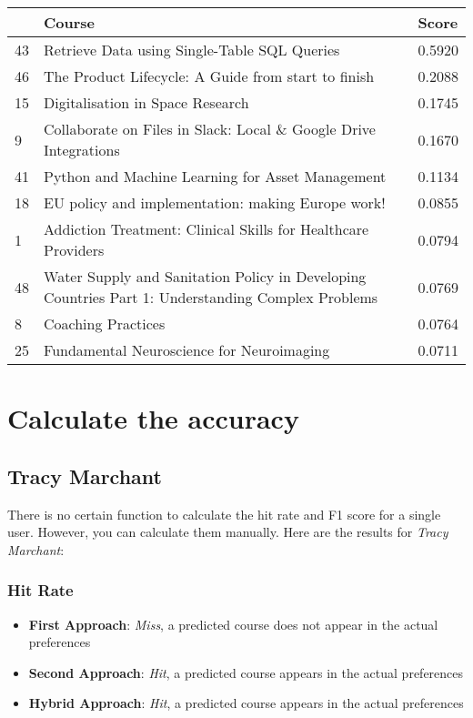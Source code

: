 \begin{table}[H]
\small
\begin{tabular}{|p{0.5cm}|p{10cm}|p{1.5cm}|}
\hline
& Course & Score \\
\hline
43 & Retrieve Data using Single-Table SQL Queries & 0.5920 \\
46 & The Product Lifecycle: A Guide from start to finish & 0.2088 \\
15 & Digitalisation in Space Research & 0.1745 \\
9 & Collaborate on Files in Slack: Local \& Google Drive Integrations & 0.1670 \\
41 & Python and Machine Learning for Asset Management & 0.1134 \\
18 & EU policy and implementation: making Europe work! & 0.0855 \\
1 & Addiction Treatment: Clinical Skills for Healthcare Providers & 0.0794 \\
48 & Water Supply and Sanitation Policy in Developing Countries Part 1: Understanding Complex Problems & 0.0769 \\
8 & Coaching Practices & 0.0764 \\
25 & Fundamental Neuroscience for Neuroimaging & 0.0711 \\
\hline
\end{tabular}
\end{table}

\section{Calculate the accuracy}

\subsection{Tracy Marchant}

There is no certain function to calculate the hit rate and F1 score for a
single user. However, you can calculate them manually. Here are the results for 
\textit{Tracy Marchant}:

\subsubsection{Hit Rate}

\begin{itemize}
    \item \textbf{First Approach}: \textit{Miss}, a predicted course does not appear in the actual preferences
    \item \textbf{Second Approach}: \textit{Hit}, a predicted course appears in the actual preferences
    \item \textbf{Hybrid Approach}: \textit{Hit}, a predicted course appears in the actual preferences
\end{itemize}


